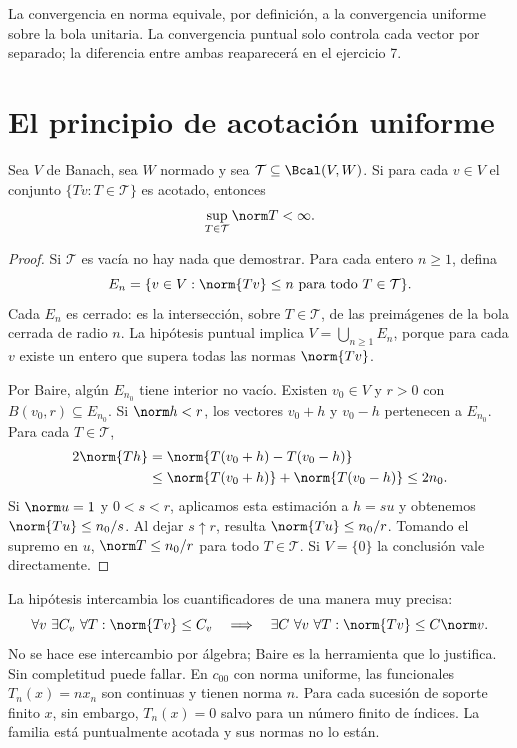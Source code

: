 La convergencia en norma equivale, por definición, a la convergencia uniforme sobre la bola unitaria. La convergencia puntual solo controla cada vector por separado; la diferencia entre ambas reaparecerá en el ejercicio 7.

\section{El principio de acotación uniforme}

\begin{teorema}\label{ch20:uniforme}
Sea $V$ de Banach, sea $W$ normado y sea $\mathcal T\subseteq\Bcal(V,W)$. Si para cada $v\in V$ el conjunto $\{Tv:T\in\mathcal T\}$ es acotado, entonces
\[\sup_{T\in\mathcal T}\norm T<\infty.\]
\end{teorema}
\begin{proof}
Si $\mathcal T$ es vacía no hay nada que demostrar. Para cada entero $n\geq1$, defina
\[
 E_n=\{v\in V:\norm{Tv}\leq n\text{ para todo }T\in\mathcal T\}.
\]
Cada $E_n$ es cerrado: es la intersección, sobre $T\in\mathcal T$, de las preimágenes de la bola cerrada de radio $n$. La hipótesis puntual implica $V=\bigcup_{n\geq1}E_n$, porque para cada $v$ existe un entero que supera todas las normas $\norm{Tv}$.

Por Baire, algún $E_{n_0}$ tiene interior no vacío. Existen $v_0\in V$ y $r>0$ con $B(v_0,r)\subseteq E_{n_0}$. Si $\norm h<r$, los vectores $v_0+h$ y $v_0-h$ pertenecen a $E_{n_0}$. Para cada $T\in\mathcal T$,
\begin{align*}
 2\norm{Th}
 &=\norm{T(v_0+h)-T(v_0-h)}\\
 &\leq\norm{T(v_0+h)}+\norm{T(v_0-h)}\leq2n_0.
\end{align*}
Si $\norm u=1$ y $0<s<r$, aplicamos esta estimación a $h=su$ y obtenemos $\norm{Tu}\leq n_0/s$. Al dejar $s\uparrow r$, resulta $\norm{Tu}\leq n_0/r$. Tomando el supremo en $u$, $\norm T\leq n_0/r$ para todo $T\in\mathcal T$. Si $V=\{0\}$ la conclusión vale directamente.
\end{proof}

\begin{observacion}
La hipótesis intercambia los cuantificadores de una manera muy precisa:
\[
 \forall v\ \exists C_v\ \forall T:\norm{Tv}\leq C_v
 \quad\Longrightarrow\quad
 \exists C\ \forall v\ \forall T:\norm{Tv}\leq C\norm v.
\]
No se hace ese intercambio por álgebra; Baire es la herramienta que lo justifica. Sin completitud puede fallar. En $c_{00}$ con norma uniforme, las funcionales $T_n(x)=nx_n$ son continuas y tienen norma $n$. Para cada sucesión de soporte finito $x$, sin embargo, $T_n(x)=0$ salvo para un número finito de índices. La familia está puntualmente acotada y sus normas no lo están.
\end{observacion}

